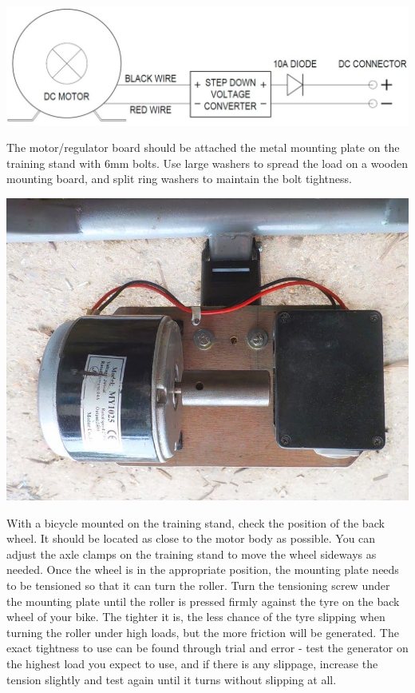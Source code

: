 \documentclass{article}
\theoremstyle{definition}
\theoremstyle{definition}
\theoremstyle{remark}
\begin{document}
  \begin{center}
    \includegraphics[width=0.75\paperwidth]{Images/image_4_2_(dc_motor).png}
  \end{center}

  The motor/regulator board should be attached the metal mounting plate on the training stand with 6mm bolts. Use large washers to spread the load on a wooden mounting board, and split ring washers to maintain the bolt tightness.

  \begin{center}
    \includegraphics[width=0.45\paperwidth]{../Images/image_4_3_(dc_motor_mounted).png}
  \end{center}

  With a bicycle mounted on the training stand, check the position of the back wheel. It should be located as close to the motor body as possible. You can adjust the axle clamps on the training stand to move the wheel sideways as needed. Once the wheel is in the appropriate position, the mounting plate needs to be tensioned so that it can turn the roller. Turn the tensioning screw under the mounting plate until the roller is pressed firmly against the tyre on the back wheel of your bike. The tighter it is, the less chance of the tyre slipping when turning the roller under high loads, but the more friction will be generated. The exact tightness to use can be found through trial and error - test the generator on the highest load you expect to use, and if there is any slippage, increase the tension slightly and test again until it turns without slipping at all.
\end{document}
